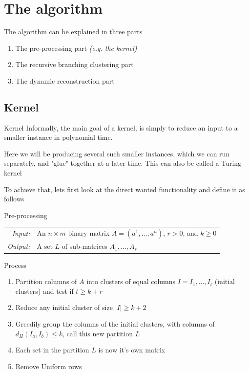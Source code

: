 \documentclass{beamer}
\begin{document}
\section{The algorithm}
\begin{frame}
  The algorithm can be explained in three parts
  \begin{enumerate}
    \item<1-> The pre-processing part \textit{(e.g. the kernel)}
    \item<2-> The recursive branching clustering part
    \item<3-> The dynamic reconstruction part
  \end{enumerate}
\end{frame}

\subsection{Kernel}
\begin{frame}
  \begin{block}{Kernel}
    Informally, the main goal of a kernel, is simply to reduce an input to a smaller instance
    in polynomial time.
  \end{block}

  Here we will be producing several such smaller instances, which we can run separately,
  and "glue" together at a later time. This can also be called a \alert{Turing-kernel}
\end{frame}

\begin{frame}
  To achieve that, lets first look at the direct wanted functionality and define it as follows

  \begin{block}{Pre-processing}
    \begin{tabular}{r l}
      \textit{Input:}  & An $n \times m$ binary matrix $A=(a^1,...,a^n)$, $r > 0$, and $k \geq 0$ \\
      \textit{Output:} & A set $L$ of sub-matrices $A_1,\dots,A_s$
    \end{tabular}
  \end{block}

  \pause

  \begin{block}{Process}
    \begin{enumerate}
      \item<3-> Partition columns of $A$ into clusters of equal columns $I = {I_1, \dots, I_t}$ (\alert{initial clusters})
      and test if $t \ge k+r$
      \item<4-> Reduce any initial cluster of size $|I| \geq k+2$
      \item<5-> Greedily group the columns of the initial clusters, with columns of $d_H(I_a,I_b) \leq k$, call this new
      partition $L$
      \item<6-> Each set in the partition $L$ is now it's own matrix
      \item<7-> Remove \alert{Uniform rows}
    \end{enumerate}
  \end{block}
\end{frame}
\end{document}
